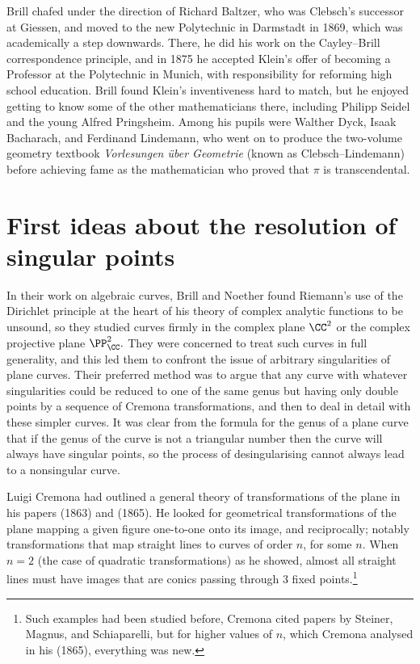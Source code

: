 Brill  chafed under the direction of  Richard Baltzer, who was Clebsch's successor at Giessen,  and moved to the new Polytechnic in Darmstadt in 1869, which was academically a step downwards. There, he did his work on the Cayley--Brill correspondence principle, and in 1875  he accepted Klein's offer of becoming a Professor at the Polytechnic in Munich, with responsibility for reforming high school education.  Brill found Klein's inventiveness hard to match, but he enjoyed getting to know some of the other mathematicians there, including Philipp Seidel and the young Alfred Pringsheim. Among his pupils were Walther Dyck, Isaak Bacharach, and Ferdinand Lindemann, who went on to produce the two-volume geometry textbook \emph{Vorlesungen \"uber Geometrie} (known as Clebsch--Lindemann) before achieving fame as the mathematician who proved that $\pi$ is transcendental.


\section{First ideas about the resolution of singular points}
In their work on algebraic curves, Brill and Noether found Riemann's use of the Dirichlet principle at the heart of his theory of complex analytic functions to be unsound, so they studied curves firmly in the complex plane $\CC^2$ or the complex projective plane $\PP_{\CC}^2.$ They were concerned to treat such curves in full generality, and this led them to confront the issue of arbitrary singularities of plane curves. Their preferred method was to argue that any curve with whatever singularities could be reduced to one of the same genus but having only double points by a sequence of Cremona transformations, and then to deal in detail with these simpler curves. It was clear from the formula for the genus of a plane curve that if the genus of the curve is not a triangular number then the curve will always have singular points, so the process of desingularising cannot always lead to a nonsingular curve.

Luigi Cremona had  outlined a general theory of transformations of the plane in his papers (1863) and (1865). He looked for geometrical transformations of the plane mapping a given figure one-to-one onto its image, and reciprocally; notably  transformations that map straight lines to curves of order $n$, for some $n.$ When $n=2$ (the case of quadratic transformations)  as he showed, almost all straight lines must have images that are conics passing through 3 fixed points.\footnote{Such examples had been studied before, Cremona  cited papers by Steiner, Magnus, and Schiaparelli, but for higher values of $n$, which Cremona analysed in his (1865), everything was new.}



